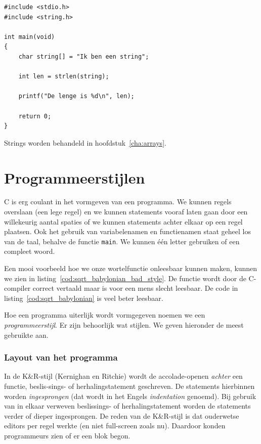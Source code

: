 \begin{lstlisting}[caption=Voorbeeld van een stringfunctie.,label=cod:intexamplestrlen]
#include <stdio.h>
#include <string.h>

int main(void)
{
    char string[] = "Ik ben een string";

    int len = strlen(string);

    printf("De lenge is %d\n", len);
    
    return 0;
}
\end{lstlisting}

Strings worden behandeld in hoofdstuk~\ref{cha:arrays}. 


%



\section{Programmeerstijlen}
C is erg coulant in het vormgeven van een programma.
We kunnen regels overslaan (een lege regel) en we kunnen statements vooraf laten gaan door een willekeurig aantal spaties of we kunnen statements achter elkaar op een regel plaatsen.
Ook het gebruik van variabelenamen en functienamen staat geheel los van de taal, behalve de functie \lstinline|main|. We kunnen één letter gebruiken of een compleet woord.

Een mooi voorbeeld hoe we onze wortelfunctie onleesbaar kunnen maken, kunnen we zien in listing~\ref{cod:sqrt_babylonian_bad_style}. De functie wordt door de C-compiler correct vertaald maar is voor een mens slecht leesbaar. De code in listing~\ref{cod:sqrt_babylonian} is veel beter leesbaar.


Hoe een programma uiterlijk wordt vormgegeven noemen we een \textsl{programmeerstijl}. Er zijn behoorlijk wat stijlen. We geven hieronder de meest gebruikte aan.

\subsubsection*{Layout van het programma}
In de K\&R-stijl (Kernighan en Ritchie) wordt de accolade-openen \textsl{achter} een functie, beslis-sings- of herhalingstatement geschreven. De statements hierbinnen worden \textsl{ingesprongen} (dat wordt in het Engels \textsl{indentation} genoemd). Bij gebruik van in elkaar verweven beslissings- of herhalingstatement worden de statements verder of dieper ingesprongen. De reden van de K\&R-stijl is dat ouderwetse editors per regel werkte (en niet full-screen zoals nu). Daardoor konden programmeurs zien of er een blok begon.

